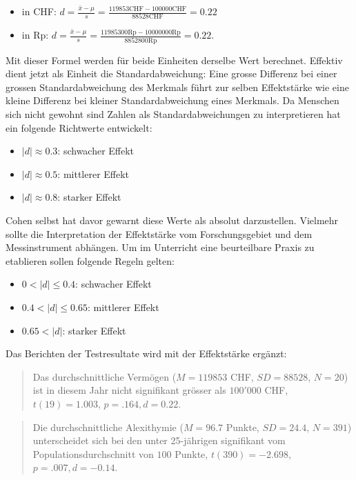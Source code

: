 \documentclass[
]{book}
\providecommand{\tightlist}{%
  \setlength{\itemsep}{0pt}\setlength{\parskip}{0pt}}
\theoremstyle{definition}
\theoremstyle{definition}
\theoremstyle{definition}
\theoremstyle{definition}
\theoremstyle{remark}
\begin{document}
\begin{itemize}
\tightlist
\item
  in CHF: \(d = \frac{\bar{x} - \mu}{s} = \frac{119853 \text{CHF} - 100000 \text{CHF}}{88528\text{CHF}}  = 0.22\)
\item
  in Rp: \(d = \frac{\bar{x} - \mu}{s} = \frac{11985300 \text{Rp} - 10000000 \text{Rp}}{8852800\text{Rp}}  = 0.22 .\)
\end{itemize}

Mit dieser Formel werden für beide Einheiten derselbe Wert berechnet. Effektiv dient jetzt als Einheit die Standardabweichung: Eine grosse Differenz bei einer grossen Standardabweichung des Merkmals führt zur selben Effektstärke wie eine kleine Differenz bei kleiner Standardabweichung eines Merkmals. Da Menschen sich nicht gewohnt sind Zahlen als Standardabweichungen zu interpretieren hat \citep{cohen1988} ein folgende Richtwerte entwickelt:

\begin{itemize}
\tightlist
\item
  \(|d| \approx 0.3\): schwacher Effekt
\item
  \(|d| \approx 0.5\): mittlerer Effekt
\item
  \(|d| \approx 0.8\): starker Effekt
\end{itemize}

Cohen selbst hat davor gewarnt diese Werte als absolut darzustellen. Vielmehr sollte die Interpretation der Effektstärke vom Forschungsgebiet und dem Messinstrument abhängen. Um im Unterricht eine beurteilbare Praxis zu etablieren sollen folgende Regeln gelten:

\begin{itemize}
\tightlist
\item
  \(0 < |d| \leq 0.4\): schwacher Effekt
\item
  \(0.4 < |d| \leq 0.65\): mittlerer Effekt
\item
  \(0.65 < |d|\): starker Effekt
\end{itemize}

Das Berichten der Testresultate wird mit der Effektstärke ergänzt:

\begin{quote}
Das durchschnittliche Vermögen (\(M = 119853\) CHF, \(SD = 88528\), \(N = 20\)) ist in diesem Jahr nicht signifikant grösser als \(100'000\) CHF, \(t(19) = 1.003\), \(p = .164, d = 0.22\).
\end{quote}

\begin{quote}
Die durchschnittliche Alexithymie (\(M = 96.7\) Punkte, \(SD = 24.4\), \(N = 391\)) unterscheidet sich bei den unter 25-jährigen signifikant vom Populationsdurchschnitt von \(100\) Punkte, \(t(390) = -2.698\), \(p = .007, d = -0.14\).
\end{quote}
\end{document}
